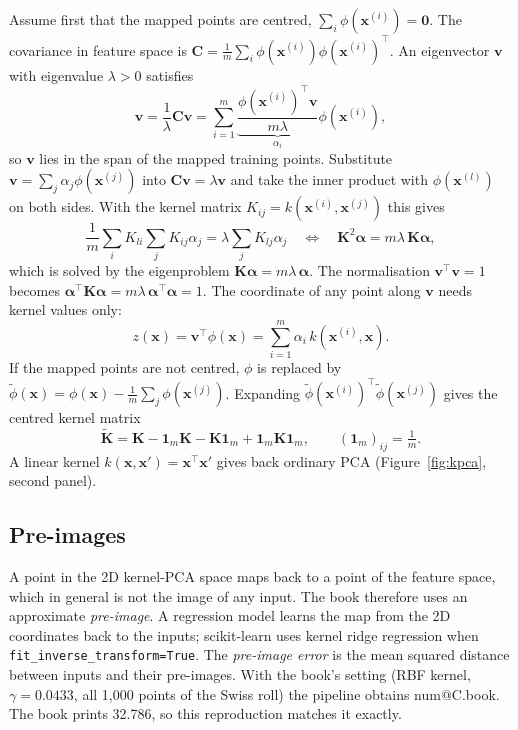 \documentclass[11pt,a4paper]{article}
\makeatletter
\newcommand{\R}[1]{\csname num@#1\endcsname}
\newcommand{\x}{\mathbf{x}}
\newcommand{\T}{^{\top}}
\makeatother
\begin{document}
Assume first that the mapped points are centred, $\sum_i\phi(\x^{(i)})=\mathbf{0}$. The covariance in feature space is $\mathbf{C}=\frac{1}{m}\sum_i\phi(\x^{(i)})\phi(\x^{(i)})\T$. An eigenvector $\mathbf{v}$ with eigenvalue $\lambda>0$ satisfies
\begin{equation}
\mathbf{v}=\frac{1}{\lambda}\mathbf{C}\mathbf{v}=\sum_{i=1}^{m}\underbrace{\frac{\phi(\x^{(i)})\T\mathbf{v}}{m\lambda}}_{\alpha_i}\phi(\x^{(i)}),
\end{equation}
so $\mathbf{v}$ lies in the span of the mapped training points. Substitute $\mathbf{v}=\sum_j\alpha_j\phi(\x^{(j)})$ into $\mathbf{C}\mathbf{v}=\lambda\mathbf{v}$ and take the inner product with $\phi(\x^{(l)})$ on both sides. With the kernel matrix $K_{ij}=k(\x^{(i)},\x^{(j)})$ this gives
\begin{equation}
\frac{1}{m}\sum_{i}K_{li}\sum_{j}K_{ij}\alpha_j=\lambda\sum_j K_{lj}\alpha_j
\quad\Longleftrightarrow\quad
\mathbf{K}^2\bm{\alpha}=m\lambda\,\mathbf{K}\bm{\alpha},
\end{equation}
which is solved by the eigenproblem $\mathbf{K}\bm{\alpha}=m\lambda\,\bm{\alpha}$. The normalisation $\mathbf{v}\T\mathbf{v}=1$ becomes $\bm{\alpha}\T\mathbf{K}\bm{\alpha}=m\lambda\,\bm{\alpha}\T\bm{\alpha}=1$. The coordinate of any point along $\mathbf{v}$ needs kernel values only:
\begin{equation}
z(\x)=\mathbf{v}\T\phi(\x)=\sum_{i=1}^{m}\alpha_i\,k(\x^{(i)},\x).
\end{equation}
If the mapped points are not centred, $\phi$ is replaced by $\tilde\phi(\x)=\phi(\x)-\frac{1}{m}\sum_j\phi(\x^{(j)})$. Expanding $\tilde\phi(\x^{(i)})\T\tilde\phi(\x^{(j)})$ gives the centred kernel matrix
\begin{equation}
\tilde{\mathbf{K}}=\mathbf{K}-\mathbf{1}_m\mathbf{K}-\mathbf{K}\mathbf{1}_m+\mathbf{1}_m\mathbf{K}\mathbf{1}_m,\qquad (\mathbf{1}_m)_{ij}=\tfrac{1}{m}.
\end{equation}
A linear kernel $k(\x,\x')=\x\T\x'$ gives back ordinary PCA (Figure~\ref{fig:kpca}, second panel).

\subsection{Pre-images}

A point in the 2D kernel-PCA space maps back to a point of the feature space, which in general is not the image of any input. The book therefore uses an approximate \emph{pre-image}. A regression model learns the map from the 2D coordinates back to the inputs; scikit-learn uses kernel ridge regression when \texttt{fit\_inverse\_transform=True}. The \emph{pre-image error} is the mean squared distance between inputs and their pre-images. With the book's setting (RBF kernel, $\gamma=0.0433$, all 1{,}000 points of the Swiss roll) the pipeline obtains \R{C.book}. The book prints 32.786, so this reproduction matches it exactly.
\end{document}

